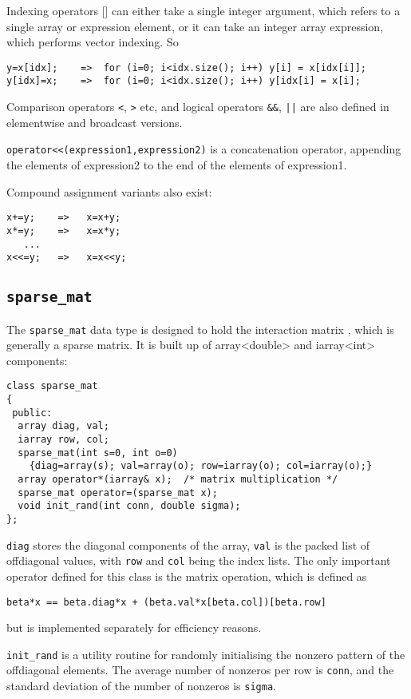 Indexing operators [] can either take a single integer argument, which
refers to a single array or expression element, or it can take an
integer array expression, which performs vector indexing. So 
\begin{verbatim}
y=x[idx];    =>  for (i=0; i<idx.size(); i++) y[i] = x[idx[i]];
y[idx]=x;    =>  for (i=0; i<idx.size(); i++) y[idx[i] = x[i];
\end{verbatim}

Comparison operators \verb+<+, \verb+>+ etc, and logical operators
\verb+&&+, \verb+||+ are also defined in elementwise and broadcast versions.

\verb+operator<<(expression1,expression2)+ is a concatenation
operator, appending the elements of expression2 to the end of the
elements of expression1. 

Compound assignment variants also exist:
\begin{verbatim}
x+=y;    =>   x=x+y;
x*=y;    =>   x=x*y;
   ...
x<<=y;   =>   x=x<<y;
\end{verbatim}

\subsection{{\tt sparse\_mat}}\label{sparse_mat}

The {\tt sparse\_mat} data type is designed to hold the
interaction matrix \bbeta, which is generally a sparse matrix. It is
built up of array<double> and iarray<int> components:

\begin{verbatim}
class sparse_mat
{
 public:
  array diag, val;
  iarray row, col;
  sparse_mat(int s=0, int o=0)
    {diag=array(s); val=array(o); row=iarray(o); col=iarray(o);}
  array operator*(iarray& x);  /* matrix multiplication */
  sparse_mat operator=(sparse_mat x);
  void init_rand(int conn, double sigma);
};
\end{verbatim}

{\tt diag} stores the diagonal components of the array, {\tt val} is
the packed list of offdiagonal values, with {\tt row} and {\tt col}
being the index lists. The only important operator defined for this
class is the matrix operation, which is defined as
\begin{verbatim}
beta*x == beta.diag*x + (beta.val*x[beta.col])[beta.row]
\end{verbatim}
but is implemented separately for efficiency reasons.

{\tt init\_rand} is a utility routine for randomly
initialising the nonzero pattern of the offdiagonal elements. The
average number of nonzeros per row is {\tt conn}, and the standard
deviation of the number of nonzeros is {\tt sigma}.

